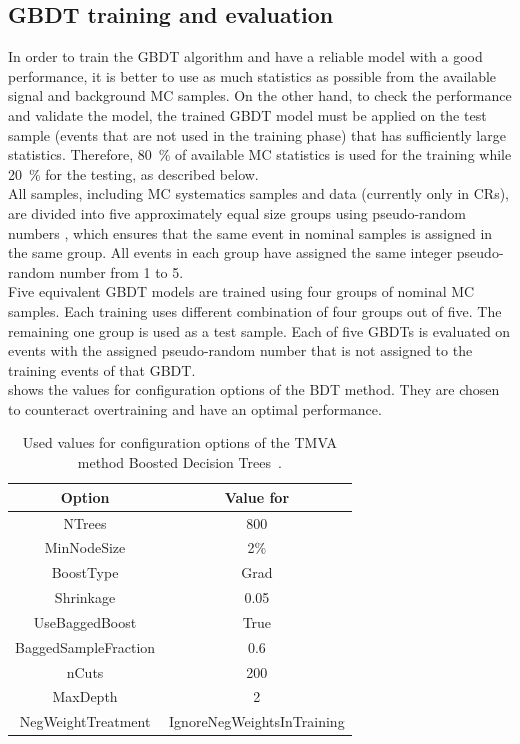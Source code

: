 \subsection {GBDT training and evaluation}
In order to train the GBDT algorithm and have a reliable model with a good performance, it is better to use as much statistics as possible from the available signal and background MC samples.
On the other hand, to check the performance and validate the model, 
the trained GBDT model must be applied on the test sample (events that are not used in the training phase) that has sufficiently large statistics. 
Therefore, \SI{80}{\%} of available MC statistics is used for the training while \SI{20}{\%} 
for the testing, as described below.\\
All samples, including MC systematics samples and data (currently only in CRs), are divided into five approximately equal size groups using pseudo-random numbers%
, which 
ensures that the same event in nominal samples %
is assigned in the same group.  
All events in each group have assigned the same integer pseudo-random number from 1 to 5.\\ 
Five equivalent GBDT models are trained using four groups of nominal MC samples. 
Each training uses different combination of four groups out of five. 
The remaining one group is used as a test sample.
Each of five GBDTs is evaluated on events with the assigned pseudo-random number
that is not assigned to the training events of that GBDT. \\
 shows the values for configuration options of the BDT method.
They are chosen to counteract overtraining
and have an optimal performance.
\begin{table}[!htbp]
	\centering 
	\begin{tabular}{cc}
		\toprule
		Option & Value for \Dthree \\
		\hline
		NTrees & 800 \\ 
		MinNodeSize & 2\% \\
		BoostType & Grad \\
		Shrinkage & 0.05 \\
		UseBaggedBoost  & True \\
		BaggedSampleFraction & 0.6\\
		nCuts  & 200 \\
		MaxDepth &  2\\
		NegWeightTreatment & IgnoreNegWeightsInTraining\\
		\bottomrule
	\end{tabular}
	\caption{
	Used values for configuration options of the TMVA method Boosted Decision Trees~\cite{TMVA}. 
}%
\label{tab:BDTparam}
\end{table}

